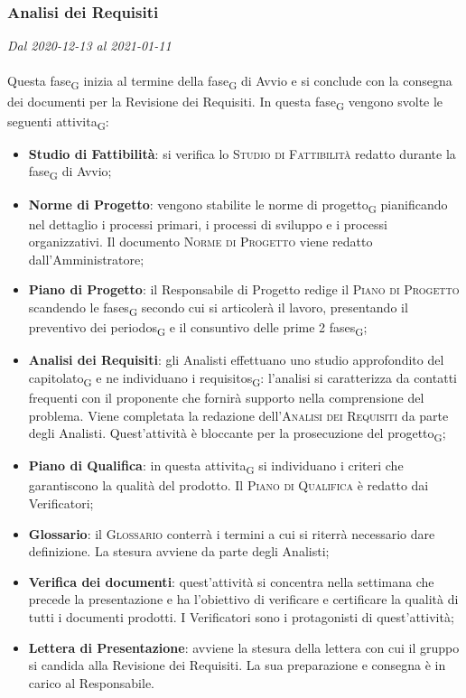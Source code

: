 \subsubsection{Analisi dei Requisiti}

\textit{Dal 2020-12-13 al 2021-01-11}
\\\\
Questa \gls{fase}\textsubscript{G} inizia al termine della \gls{fase}\textsubscript{G} di Avvio e si conclude con la consegna dei documenti per la Revisione dei Requisiti.
In questa \gls{fase}\textsubscript{G} vengono svolte le seguenti \gls{attivita}\textsubscript{G}:
\begin{itemize}
	\item \textbf{Studio di Fattibilità}: si verifica lo \textsc{Studio di Fattibilità} redatto durante la \gls{fase}\textsubscript{G} di Avvio;
	\item \textbf{Norme di Progetto}: vengono stabilite le norme di \gls{progetto}\textsubscript{G} pianificando nel dettaglio i processi primari, i processi di sviluppo e i processi organizzativi. Il documento \textsc{Norme di Progetto} viene redatto dall'Amministratore;
	\item \textbf{Piano di Progetto}: il Responsabile di Progetto redige il \textsc{Piano di Progetto} scandendo le \glspl{fase}\textsubscript{G} secondo cui si articolerà il lavoro, presentando il preventivo dei \glspl{periodo}\textsubscript{G} e il consuntivo delle prime 2 \glspl{fase}\textsubscript{G};
	\item \textbf{Analisi dei Requisiti}: gli Analisti effettuano uno studio approfondito del \gls{capitolato}\textsubscript{G} e ne individuano i \glspl{requisito}\textsubscript{G}: l'analisi si caratterizza da contatti frequenti con il proponente che fornirà supporto nella comprensione del problema. Viene completata la redazione dell'\textsc{Analisi dei Requisiti} da parte degli Analisti. Quest'attività è bloccante per la prosecuzione del \gls{progetto}\textsubscript{G};
	\item \textbf{Piano di Qualifica}: in questa \gls{attivita}\textsubscript{G} si individuano i criteri che garantiscono la qualità del prodotto. Il \textsc{Piano di Qualifica} è redatto dai Verificatori;
	\item \textbf{Glossario}: il \textsc{Glossario} conterrà i termini a cui si riterrà necessario dare definizione. La stesura avviene da parte degli Analisti;
	\item \textbf{Verifica dei documenti}: quest'attività si concentra nella settimana che precede la presentazione e ha l'obiettivo di verificare e certificare la qualità di tutti i documenti prodotti. I Verificatori sono i protagonisti di quest'attività;
	\item \textbf{Lettera di Presentazione}: avviene la stesura della lettera con cui il gruppo si candida alla Revisione dei Requisiti. La sua preparazione e consegna è in carico al Responsabile.
\end{itemize}


